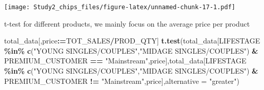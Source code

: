 \documentclass[
]{article}
\newenvironment{Shaded}{\begin{snugshade}}{\end{snugshade}}
\newcommand{\AttributeTok}[1]{\textcolor[rgb]{0.13,0.29,0.53}{#1}}
\newcommand{\DecValTok}[1]{\textcolor[rgb]{0.00,0.00,0.81}{#1}}
\newcommand{\FloatTok}[1]{\textcolor[rgb]{0.00,0.00,0.81}{#1}}
\newcommand{\FunctionTok}[1]{\textcolor[rgb]{0.13,0.29,0.53}{\textbf{#1}}}
\newcommand{\NormalTok}[1]{#1}
\newcommand{\OtherTok}[1]{\textcolor[rgb]{0.56,0.35,0.01}{#1}}
\newcommand{\SpecialCharTok}[1]{\textcolor[rgb]{0.81,0.36,0.00}{\textbf{#1}}}
\newcommand{\StringTok}[1]{\textcolor[rgb]{0.31,0.60,0.02}{#1}}
\begin{document}
\begin{Shaded}
\end{Shaded}

\texttt{[image: Study2\_chips\_files/figure-latex/unnamed-chunk-17-1.pdf]}

t-test for different products, we mainly focus on the average price per
product

\begin{Shaded}
\begin{Highlighting}[]
\NormalTok{total\_data[,price}\SpecialCharTok{:=}\NormalTok{TOT\_SALES}\SpecialCharTok{/}\NormalTok{PROD\_QTY]}
\FunctionTok{t.test}\NormalTok{(total\_data[LIFESTAGE }\SpecialCharTok{\%in\%} \FunctionTok{c}\NormalTok{(}\StringTok{"YOUNG SINGLES/COUPLES"}\NormalTok{,}\StringTok{"MIDAGE SINGLES/COUPLES"}\NormalTok{) }\SpecialCharTok{\&}\NormalTok{ PREMIUM\_CUSTOMER }\SpecialCharTok{==} \StringTok{"Mainstream"}\NormalTok{,price],total\_data[LIFESTAGE }\SpecialCharTok{\%in\%} \FunctionTok{c}\NormalTok{(}\StringTok{"YOUNG SINGLES/COUPLES"}\NormalTok{,}\StringTok{"MIDAGE SINGLES/COUPLES"}\NormalTok{) }\SpecialCharTok{\&}\NormalTok{ PREMIUM\_CUSTOMER }\SpecialCharTok{!=} \StringTok{"Mainstream"}\NormalTok{,price],}\AttributeTok{alternative =} \StringTok{"greater"}\NormalTok{)}
\end{Highlighting}
\end{Shaded}
\end{document}
